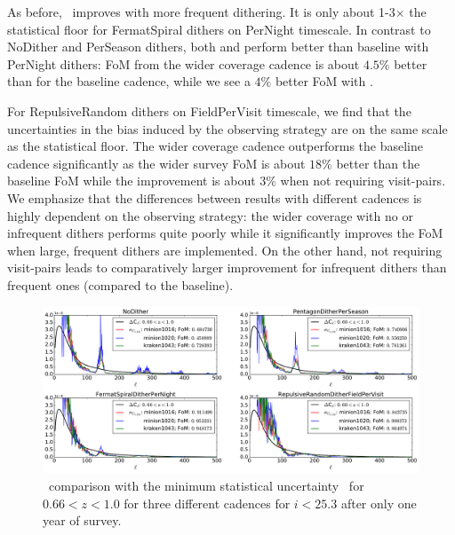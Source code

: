 
As before, \sigmaOS\ improves with more frequent dithering. It is only about 1-3$\times$ the statistical floor for FermatSpiral dithers on PerNight timescale. In contrast to NoDither and PerSeason dithers, both  and  perform better than baseline with PerNight dithers: FoM from the wider coverage cadence is about $4.5\%$ better than for the baseline cadence, while we see a $4\%$ better FoM with . 

For RepulsiveRandom dithers on FieldPerVisit timescale, we find that the uncertainties in the bias induced by the observing strategy are on the same scale as the statistical floor. The wider coverage cadence outperforms the baseline cadence significantly as  the wider survey FoM is about $18\%$ better than the baseline FoM while the improvement is about 3$\%$ when not requiring visit-pairs. We emphasize that the differences between results with different cadences is highly dependent on the observing strategy: the wider coverage with no or infrequent dithers performs quite poorly while it significantly improves the FoM when large, frequent dithers are implemented. On the other hand, not requiring visit-pairs leads to comparatively larger improvement for infrequent dithers than frequent ones (compared to the baseline).

\begin{figure}[!htb]
      \centering\includegraphics[width=\linewidth]{figs/awan_1yr_goldSample_3cadences.pdf}
       \vspace*{-2em}
\caption{\sigmaOS\ comparison with the minimum statistical uncertainty \statFloor\ for $0.66<z<1.0$ for three different cadences for $i<25.3$ after only one year of survey.}
\label{fig: cadences: 1yr}
\end{figure}

